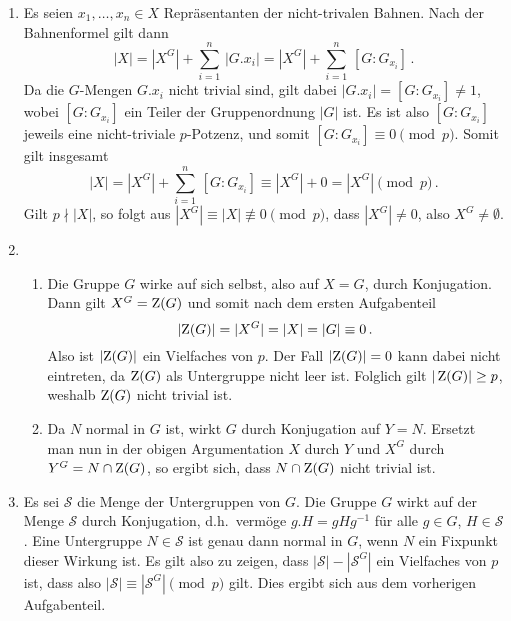 \begin{solution}
  \begin{enumerate}
    \item
      Es seien $x_1, \dotsc, x_n \in X$ Repräsentanten der nicht-trivalen Bahnen.
      Nach der Bahnenformel gilt dann
      \[
          |X|
        = |X^G| + \sum_{i=1}^n \, |G.x_i|
        = |X^G| + \sum_{i=1}^n \, [G : G_{x_i}] \,.
      \]
      Da die $G$-Mengen $G.x_i$ nicht trivial sind, gilt dabei $|G.x_i| = [G : G_{x_i}] \neq 1$, wobei $[G : G_{x_i}]$ ein Teiler der Gruppenordnung $|G|$ ist.
      Es ist also $[G : G_{x_i}]$ jeweils eine nicht-triviale $p$-Potzenz, und somit $[G : G_{x_i}] \equiv 0 \pmod{p}$.
      Somit gilt insgesamt
      \[
                |X|
        =       |X^G| + \sum_{i=1}^n \, [G : G_{x_i}]
        \equiv  |X^G| + 0
        =       |X^G|
        \pmod{p} \,.
      \]
      Gilt $p \nmid |X|$, so folgt aus $|X^G| \equiv |X| \not\equiv 0 \pmod{p}$, dass $|X^G| \neq 0$, also $X^G \neq \emptyset$.
    \item
      \begin{enumerate}
        \item
          Die Gruppe $G$ wirke auf sich selbst, also auf $X = G$, durch Konjugation.
          Dann gilt $X^G = \operatorname{Z}(G)$ und somit nach dem ersten Aufgabenteil
          \[
                    |{\operatorname{Z}(G)}|
            =       |X^G|
            =       |X|
            =       |G|
            \equiv  0 \,.
          \]
          Also ist $|{\operatorname{Z}(G)}|$ ein Vielfaches von $p$.
          Der Fall $|{\operatorname{Z}(G)}| = 0$ kann dabei nicht eintreten, da $\operatorname{Z}(G)$ als Untergruppe nicht leer ist.
          Folglich gilt $|\operatorname{Z}(G)| \geq p$, weshalb $\operatorname{Z}(G)$ nicht trivial ist.
        \item
          Da $N$ normal in $G$ ist, wirkt $G$ durch Konjugation auf $Y = N$.
          Ersetzt man nun in der obigen Argumentation $X$ durch $Y$ und $X^G$ durch $Y^G = N \cap \operatorname{Z}(G)$, so ergibt sich, dass $N \cap \operatorname{Z}(G)$ nicht trivial ist.
      \end{enumerate}
    \item
      Es sei $\mathcal{S}$ die Menge der Untergruppen von $G$.
      Die Gruppe $G$ wirkt auf der Menge $\mathcal{S}$ durch Konjugation, d.h.\ vermöge $g.H = gHg^{-1}$ für alle $g \in G$, $H \in \mathcal{S}$.
      Eine Untergruppe $N \in \mathcal{S}$ ist genau dann normal in $G$, wenn $N$ ein Fixpunkt dieser Wirkung ist.
      Es gilt also zu zeigen, dass $|\mathcal{S}| - |\mathcal{S}^G|$ ein Vielfaches von $p$ ist, dass also $|\mathcal{S}| \equiv |\mathcal{S}^G| \pmod{p}$ gilt.
      Dies ergibt sich aus dem vorherigen Aufgabenteil.
  \end{enumerate}
\end{solution}



